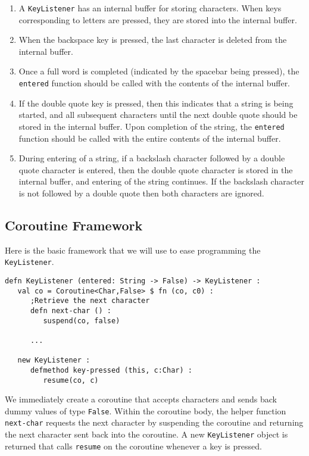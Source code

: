 \documentclass[10pt,oneside]{book}
\begin{document}
\begin{enumerate}
\item A \texttt{\frenchspacing KeyListener} has an internal buffer for storing characters. When keys corresponding to letters are pressed, they are stored into the internal buffer.
\item When the backspace key is pressed, the last character is deleted from the internal buffer.
\item Once a full word is completed (indicated by the spacebar being pressed), the \texttt{\frenchspacing entered} function should be called with the contents of the internal buffer.
\item If the double quote key is pressed, then this indicates that a string is being started, and all subsequent characters until the next double quote should be stored in the internal buffer. Upon completion of the string, the \texttt{\frenchspacing entered} function should be called with the entire contents of the internal buffer.
\item During entering of a string, if a backslash character followed by a double quote character is entered, then the double quote character is stored in the internal buffer, and entering of the string continues. If the backslash character is not followed by a double quote then both characters are ignored.
\end{enumerate}

\subsection*{Coroutine Framework}
Here is the basic framework that we will use to ease programming the \texttt{\frenchspacing KeyListener}.
\begin{lstlisting}
defn KeyListener (entered: String -> False) -> KeyListener :
   val co = Coroutine<Char,False> $ fn (co, c0) :
      ;Retrieve the next character
      defn next-char () :
         suspend(co, false)

      ...

   new KeyListener :
      defmethod key-pressed (this, c:Char) :
         resume(co, c)
\end{lstlisting}
We immediately create a coroutine that accepts characters and sends back dummy values of type \texttt{\frenchspacing False}. Within the coroutine body, the helper function \texttt{\frenchspacing next-char} requests the next character by suspending the coroutine and returning the next character sent back into the coroutine. A new \texttt{\frenchspacing KeyListener} object is returned that calls \texttt{\frenchspacing resume} on the coroutine whenever a key is pressed.
\end{document}
